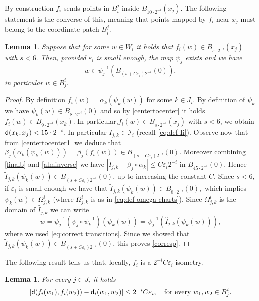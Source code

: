 \documentclass[11pt]{article}
\newcommand{\eps}{\varepsilon}
\newcommand{\sfd}{{\sf d}}
\theoremstyle{plain}
\newtheorem{lemma}[theorem]{Lemma}
\theoremstyle{definition}
\numberwithin{equation}{section}
\begin{document}
By construction $f_i$ sends points in $B_i^j$ inside $B_{10\cdot 2^{-i}}(x_j)$. The following statement is the converse of this, meaning that points mapped by $f_i$ near $x_j$ must belong to the coordinate patch $B_i^j$.
\begin{lemma}\label{correspl}
	 Suppose that for some $w \in W_i$ it holds that $f_i(w)\in B_{s\cdot 2^{-i}}(x_{j})$ with $s<6.$ Then, provided $\eps_i$ is small enough, the map $\psi_j$ exists and we have
	\begin{equation}\label{corresp}
		w \in \psi_j^{-1}(B_{(s+C\eps_i)2^{-i}}(0)),
	\end{equation}
	in particular $w \in B_j^i.$
\end{lemma}
\begin{proof}
	By definition $f_i(w)=\alpha_k(\psi_k(w))$ for some $k \in J_i$. By definition of $\psi_k$ we have $\psi_k(w)\in B_{8\cdot 2^{-i}}(0)$ and so by \eqref{centertocenter} it holds $f_i(w)\in B_{9\cdot 2^{-i}}(x_{k})$. In particular,$f_i(w)\in B_{s\cdot 2^{-i}}(x_{j})$ with $s<6$, we obtain $\sfd(x_k,x_j)<15\cdot 2^{-i}.$ In particular $I_{j,k}\in \mathcal I_i$ (recall \eqref{eq:def Ii}). Observe now that from \eqref{centertocenter1} we deduce that $\beta_{j}(\alpha_k(\psi_k(w)))=\beta_{j}(f_i(w)) \in B_{(s+C\eps_i)2^{-i}}(0)$. Moreover combining \eqref{finalb} and \eqref{alminverse} we have $|\tilde  I_{j,k}-\beta_j\circ \alpha_k|\le C\eps_i2^{-i}$ in $B_{45\cdot2^{-i}}(0)$. Hence  $\tilde I_{j,k}(\psi_k(w))\in B_{(s+C\eps_i)2^{-i}}(0)$, up to increasing the constant $C$. Since $s<6$, if $\eps_i$ is small enough we have that $\tilde I_{j,k}(\psi_k(w))\in B_{8\cdot 2^{-i}}(0),$ which implies $\psi_k(w) \in \Omega^i_{j,k}$ (where $\Omega^i_{j,k}$ is as in \eqref{eq:def omega charts}). Since $\Omega^i_{j,k}$ is the domain of $\hat I_{j,k}$ we can write
	$$w=\psi_j^{-1}(\psi_j \circ \psi_k^{-1})(\psi_k(w))=\psi_j^{-1}(\hat I_{j,k}(\psi_k(w))),$$
 where we used \eqref{eq:correct transitions}.
	Since we showed that $\tilde I_{j,k}(\psi_k(w))\in B_{(s+C\eps_i)2^{-i}}(0)$, this proves \eqref{corresp}.
\end{proof}
The following  result tells us that, locally, $f_i$ is a $2^{-i}C\eps_i$-isometry.
\begin{lemma}\label{fidii}
For every $j\in J_i$ it holds
	\begin{equation}\label{fid}
		|\sfd(f_i(w_1),f_i(w_2))-\sfd_i(w_1,w_2)|\le 2^{-i}C\eps_i, \quad \text{for every $w_1,w_2 \in B_j^i$.}
	\end{equation}
\end{lemma}
\end{document}
